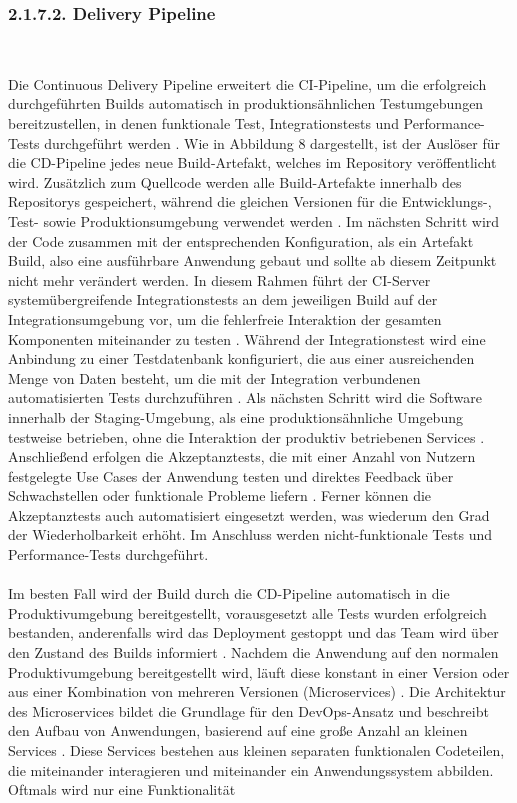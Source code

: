 \subsubsection{2.1.7.2. Delivery Pipeline} $~$

Die Continuous Delivery Pipeline erweitert die CI-Pipeline, um die erfolgreich durchgeführten Builds automatisch in produktionsähnlichen Testumgebungen bereitzustellen, in denen funktionale Test, Integrationstests und Performance-Tests durchgeführt werden \cite[S. 17]{sharma_devops_2017}. Wie in Abbildung 8 dargestellt, ist der Auslöser für die CD-Pipeline jedes neue Build-Artefakt, welches im Repository veröffentlicht wird. Zusätzlich zum Quellcode werden alle Build-Artefakte innerhalb des Repositorys gespeichert, während die gleichen Versionen für die Entwicklungs-, Test- sowie Produktionsumgebung verwendet werden \cite[S. 109 - 110]{kim_devops-handbuch_2017}. Im nächsten Schritt wird der Code zusammen mit der entsprechenden Konfiguration, als ein Artefakt Build, also eine ausführbare Anwendung gebaut und sollte ab diesem Zeitpunkt nicht mehr verändert werden. In diesem Rahmen führt der CI-Server systemübergreifende Integrationstests an dem jeweiligen Build auf der Integrationsumgebung vor, um die fehlerfreie Interaktion der gesamten Komponenten miteinander zu testen \cite[S. 122]{kim_devops-handbuch_2017}. Während der Integrationstest wird eine Anbindung zu einer Testdatenbank konfiguriert, die aus einer ausreichenden Menge von Daten besteht, um die mit der Integration verbundenen automatisierten Tests durchzuführen \cite[S. 100 - 101]{bass_devops_2015}. Als nächsten Schritt wird die Software innerhalb der Staging-Umgebung, als eine produktionsähnliche Umgebung testweise betrieben, ohne die Interaktion der produktiv betriebenen Services \cite[S. 100 - 101]{bass_devops_2015}. Anschließend erfolgen die Akzeptanztests, die mit einer Anzahl von Nutzern festgelegte Use Cases der Anwendung testen und direktes Feedback über Schwachstellen oder funktionale Probleme liefern \cite[S. 16 - 18]{sharma_devops_2017}. Ferner können die Akzeptanztests auch automatisiert eingesetzt werden, was wiederum den Grad der Wiederholbarkeit erhöht. Im Anschluss werden nicht-funktionale Tests und Performance-Tests durchgeführt.\\\\ Im besten Fall wird der Build durch die CD-Pipeline automatisch in die Produktivumgebung bereitgestellt, vorausgesetzt alle Tests wurden erfolgreich bestanden, anderenfalls wird das Deployment gestoppt und das Team wird über den Zustand des Builds informiert \cite[S. 64]{forsgren_mindset_2019}. Nachdem die Anwendung auf den normalen Produktivumgebung bereitgestellt wird, läuft diese konstant in einer Version oder aus einer Kombination von mehreren Versionen (Microservices) \cite[S. 86]{kim_devops-handbuch_2017}. Die Architektur des Microservices bildet die Grundlage für den DevOps-Ansatz und beschreibt den Aufbau von Anwendungen, basierend auf eine große Anzahl an kleinen Services \cite{sollner_devops_2017}. Diese Services bestehen aus kleinen separaten funktionalen Codeteilen, die miteinander interagieren und miteinander ein Anwendungssystem abbilden. Oftmals wird nur eine Funktionalität 